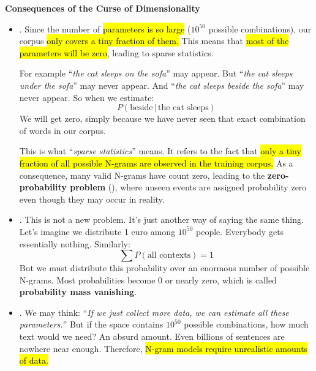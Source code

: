 \newpage

\begin{flushleft}
    \textcolor{Red2}{ \textbf{Consequences of the Curse of Dimensionality}}
\end{flushleft}
\begin{itemize}
    \item {}. Since the number of \hl{parameters is so large} ($10^{50}$ possible combinations), our corpus \hl{only covers a tiny fraction of them.} This means that \hl{most of the parameters will be zero}, leading to sparse statistics.
    
    For example ``\emph{the cat sleeps on the sofa}'' may appear. But ``\emph{the cat sleeps under the sofa}'' may never appear. And ``\emph{the cat sleeps beside the sofa}'' may never appear. So when we estimate:
    \begin{equation*}
        P\left(\text{beside} \, | \,\text{the cat sleeps}\right)
    \end{equation*}
    We will get zero, simply because we have never seen that exact combination of words in our corpus.

    This is what ``\emph{sparse statistics}'' means. It refers to the fact that \hl{only a tiny fraction of all possible N-grams are observed in the training corpus.} As a consequence, many valid N-grams have count zero, leading to the \textbf{zero-probability problem} (), where unseen events are assigned probability zero even though they may occur in reality.
    
    
    \item {}. This is not a new problem. It's just another way of saying the same thing. Let's imagine we distribute 1 euro among $10^{50}$ people. Everybody gets essentially nothing. Similarly:
    \begin{equation*}
        \sum P\left(\text{all contexts}\right) = 1
    \end{equation*}
    But we must distribute this probability over an enormous number of possible N-grams. Most probabilities become $0$ or nearly zero, which is called \textbf{probability mass vanishing}.
    
    
    \item {}. We may think: ``\emph{If we just collect more data, we can estimate all these parameters.}'' But if the space contains $10^{50}$ possible combinations, how much text would we need? An absurd amount. Even billions of sentences are nowhere near enough. Therefore, \hl{N-gram models require unrealistic amounts of data.}
    

\end{itemize}
